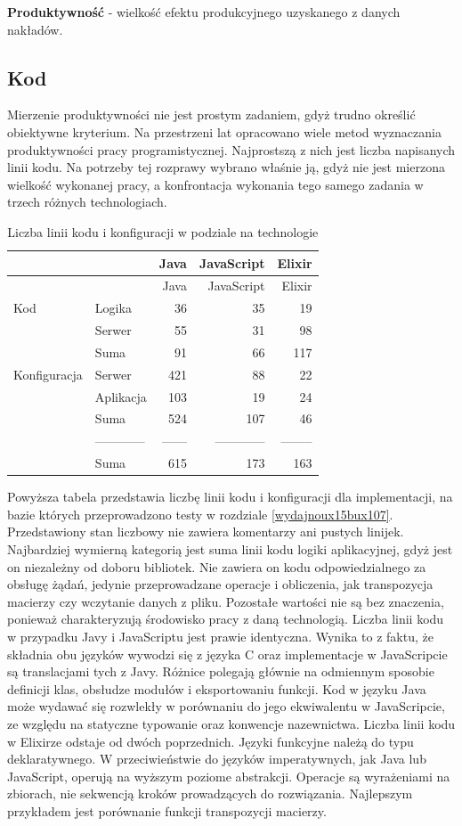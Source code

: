 \documentclass[12pt,twoside]{article}
\begin{document}
\textbf{Produktywność} - wielkość efektu produkcyjnego uzyskanego z
danych nakładów. \autocite{sjp2015}

\subsection{Kod}\label{kod}

Mierzenie produktywności nie jest prostym zadaniem, gdyż trudno określić
obiektywne kryterium. Na przestrzeni lat opracowano wiele metod
wyznaczania produktywności pracy programistycznej. Najprostszą z nich
jest liczba napisanych linii kodu. Na potrzeby tej rozprawy wybrano
właśnie ją, gdyż nie jest mierzona wielkość wykonanej pracy, a
konfrontacja wykonania tego samego zadania w trzech różnych
technologiach.

\begin{longtable}[c]{@{}llrrr@{}}
\caption{Liczba linii kodu i konfiguracji w podziale na
technologie}\tabularnewline
\toprule
& & Java & JavaScript & Elixir\tabularnewline
\midrule
\endfirsthead
\toprule
& & Java & JavaScript & Elixir\tabularnewline
\midrule
\endhead
Kod & Logika & 36 & 35 & 19\tabularnewline
& Serwer & 55 & 31 & 98\tabularnewline
& Suma & 91 & 66 & 117\tabularnewline
Konfiguracja & Serwer & 421 & 88 & 22\tabularnewline
& Aplikacja & 103 & 19 & 24\tabularnewline
& Suma & 524 & 107 & 46\tabularnewline
& ------------ & ------ & ------------ & --------\tabularnewline
& Suma & 615 & 173 & 163\tabularnewline
\bottomrule
\end{longtable}

Powyższa tabela przedstawia liczbę linii kodu i konfiguracji dla
implementacji, na bazie których przeprowadzono testy w rozdziale
\ref{wydajnoux15bux107}. Przedstawiony stan liczbowy nie zawiera
komentarzy ani pustych linijek. Najbardziej wymierną kategorią jest suma
linii kodu logiki aplikacyjnej, gdyż jest on niezależny od doboru
bibliotek. Nie zawiera on kodu odpowiedzialnego za obsługę żądań,
jedynie przeprowadzane operacje i obliczenia, jak transpozycja macierzy
czy wczytanie danych z pliku. Pozostałe wartości nie są bez znaczenia,
ponieważ charakteryzują środowisko pracy z daną technologią. Liczba
linii kodu w przypadku Javy i JavaScriptu jest prawie identyczna. Wynika
to z faktu, że składnia obu języków wywodzi się z języka C oraz
implementacje w JavaScripcie są translacjami tych z Javy. Różnice
polegają głównie na odmiennym sposobie definicji klas, obsłudze modułów
i eksportowaniu funkcji. Kod w języku Java może wydawać się rozwlekły w
porównaniu do jego ekwiwalentu w JavaScripcie, ze względu na statyczne
typowanie oraz konwencje nazewnictwa. Liczba linii kodu w Elixirze
odstaje od dwóch poprzednich. Języki funkcyjne należą do typu
deklaratywnego. W przeciwieństwie do języków imperatywnych, jak Java lub
JavaScript, operują na wyższym poziome abstrakcji. Operacje są
wyrażeniami na zbiorach, nie sekwencją kroków prowadzących do
rozwiązania. Najlepszym przykładem jest porównanie funkcji transpozycji
macierzy.
\end{document}

